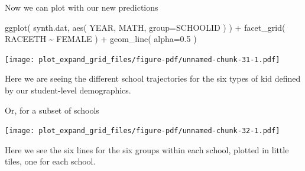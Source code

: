 \documentclass[
  letterpaper,
  DIV=11,
  numbers=noendperiod]{scrreprt}
\newenvironment{Shaded}{}{}
\newcommand{\AttributeTok}[1]{\textcolor[rgb]{0.49,0.56,0.16}{#1}}
\newcommand{\DecValTok}[1]{\textcolor[rgb]{0.25,0.63,0.44}{#1}}
\newcommand{\FloatTok}[1]{\textcolor[rgb]{0.25,0.63,0.44}{#1}}
\newcommand{\FunctionTok}[1]{\textcolor[rgb]{0.02,0.16,0.49}{#1}}
\newcommand{\NormalTok}[1]{#1}
\newcommand{\OtherTok}[1]{\textcolor[rgb]{0.00,0.44,0.13}{#1}}
\newcommand{\SpecialCharTok}[1]{\textcolor[rgb]{0.25,0.44,0.63}{#1}}
\newcommand{\StringTok}[1]{\textcolor[rgb]{0.25,0.44,0.63}{#1}}
\begin{document}
Now we can plot with our new predictions

\begin{Shaded}
\begin{Highlighting}[]
\FunctionTok{ggplot}\NormalTok{( synth.dat, }\FunctionTok{aes}\NormalTok{( YEAR, MATH, }\AttributeTok{group=}\NormalTok{SCHOOLID ) ) }\SpecialCharTok{+}
  \FunctionTok{facet\_grid}\NormalTok{( RACEETH }\SpecialCharTok{\textasciitilde{}}\NormalTok{ FEMALE ) }\SpecialCharTok{+}
  \FunctionTok{geom\_line}\NormalTok{( }\AttributeTok{alpha=}\FloatTok{0.5}\NormalTok{ )}
\end{Highlighting}
\end{Shaded}

\texttt{[image: plot\_expand\_grid\_files/figure-pdf/unnamed-chunk-31-1.pdf]}

Here we are seeing the different school trajectories for the six types
of kid defined by our student-level demographics.

Or, for a subset of schools

\begin{Shaded}
\end{Shaded}

\texttt{[image: plot\_expand\_grid\_files/figure-pdf/unnamed-chunk-32-1.pdf]}

Here we see the six lines for the six groups within each school, plotted
in little tiles, one for each school.
\end{document}
